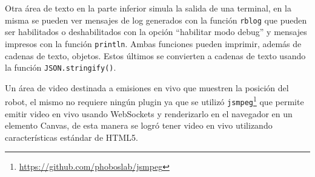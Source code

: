 Otra área de texto en la parte inferior
simula la salida de una terminal, en la misma
se pueden ver mensajes de log generados con la función
\texttt{rblog} que pueden ser habilitados o deshabilitados con la opción
``habilitar modo debug''
 y mensajes impresos con la función \texttt{println}.
Ambas funciones pueden imprimir, además de cadenas de texto, objetos. Estos últimos
se convierten a cadenas de texto usando la función \texttt{JSON.stringify()}.

Un área de video destinada a emisiones en vivo que muestren la posición
del robot, el mismo no requiere ningún plugin ya que se utilizó
\texttt{jsmpeg}\footnote{\url{https://github.com/phoboslab/jsmpeg}}
que permite emitir video en vivo usando WebSockets y renderizarlo
en el navegador en un elemento Canvas, de esta manera se logró tener
video en vivo utilizando características estándar de HTML5.
